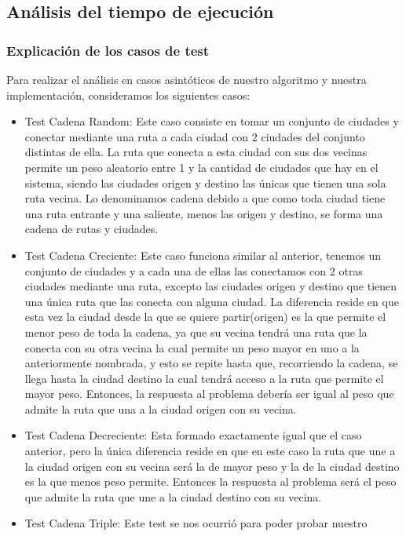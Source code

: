 \clearpage

\subsection{Análisis del tiempo de ejecución}

\subsubsection{Explicación de los casos de test}
Para realizar el análisis en casos asintóticos de nuestro algoritmo y nuestra
implementación, consideramos los
siguientes casos:\\
\begin{itemize}
  \item Test Cadena Random: Este caso consiste en tomar un conjunto de ciudades
y
conectar mediante una ruta a cada ciudad con 2 ciudades del conjunto distintas
de ella. La ruta que conecta a
esta ciudad con sus dos vecinas permite un peso aleatorio entre 1 y la cantidad
de ciudades que hay en el
sistema, siendo las ciudades origen y destino las únicas que tienen una sola
ruta vecina. Lo denominamos
cadena debido a que como toda ciudad tiene una ruta entrante y una saliente,
menos las origen y destino, se forma una cadena de
rutas y ciudades.
  \item Test Cadena Creciente: Este caso funciona similar al anterior, tenemos
un conjunto de ciudades y a
cada una de ellas las conectamos con 2 otras ciudades mediante una ruta, excepto
las ciudades origen y destino
que
tienen una única ruta que las conecta con alguna ciudad. La diferencia reside en
que esta vez la ciudad desde
la que se quiere partir(origen) es la que permite el menor peso de toda la
cadena, ya que su vecina tendrá una
ruta que la conecta con su otra vecina la cual permite un peso mayor en uno a la
anteriormente nombrada, y
esto se repite hasta que, recorriendo la cadena, se llega hasta la ciudad
destino la cual tendrá acceso a la
ruta que permite el mayor peso. Entonces, la respuesta al problema debería ser
igual al peso que admite la
ruta que una a la ciudad origen con su vecina.
  \item Test Cadena Decreciente: Esta formado exactamente igual que el caso
anterior, pero la única diferencia
reside en que en este caso la ruta que une a la ciudad origen con su vecina será
la de mayor peso y la
de la ciudad destino es la que menos peso permite. Entonces la respuesta al
problema será el peso que admite
la ruta que une a la ciudad destino con su vecina.
  \item Test Cadena Triple: Este test se nos ocurrió para poder probar nuestro

\end{itemize}
